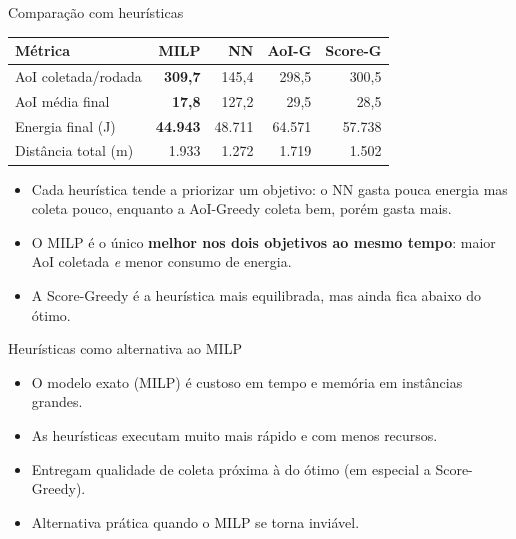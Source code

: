 \documentclass[aspectratio=169,11pt]{beamer}
\begin{document}
\begin{frame}{Comparação com heurísticas}
  \begin{center}
  \small
  \begin{tabular}{lrrrr}
    \toprule
    \textbf{Métrica} & \textbf{MILP} & \textbf{NN} & \textbf{AoI-G} & \textbf{Score-G} \\
    \midrule
    AoI coletada/rodada & \textbf{309,7} & 145,4 & 298,5 & 300,5 \\
    AoI média final     & \textbf{17,8}  & 127,2 & 29,5  & 28,5 \\
    Energia final (J)   & \textbf{44.943} & 48.711 & 64.571 & 57.738 \\
    Distância total (m) & 1.933 & 1.272 & 1.719 & 1.502 \\
    \bottomrule
  \end{tabular}
  \end{center}
  \vspace{0.4em}
  \begin{itemize}
    \item Cada heurística tende a priorizar um objetivo: o NN gasta pouca energia mas coleta pouco, enquanto a AoI-Greedy coleta bem, porém gasta mais.
    \item O MILP é o único \textbf{melhor nos dois objetivos ao mesmo tempo}: maior AoI coletada \emph{e} menor consumo de energia.
    \item A Score-Greedy é a heurística mais equilibrada, mas ainda fica abaixo do ótimo.
  \end{itemize}
\end{frame}

\begin{frame}{Heurísticas como alternativa ao MILP}
  \begin{itemize}
    \item O modelo exato (MILP) é custoso em tempo e memória em instâncias grandes.
    \item As heurísticas executam muito mais rápido e com menos recursos.
    \item Entregam qualidade de coleta próxima à do ótimo (em especial a Score-Greedy).
    \item Alternativa prática quando o MILP se torna inviável.
  \end{itemize}
\end{frame}
\end{document}
